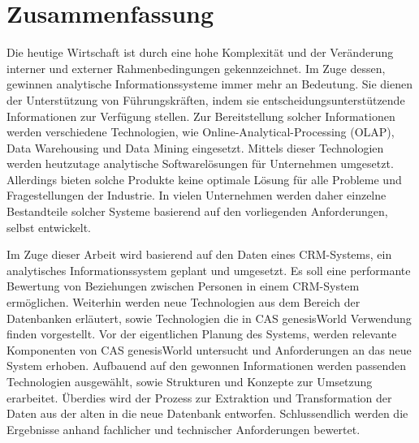 
\chapter*{\centering Zusammenfassung}

Die heutige Wirtschaft ist durch eine hohe Komplexität und der Veränderung interner und externer Rahmenbedingungen gekennzeichnet. Im Zuge dessen, gewinnen analytische Informationssysteme immer mehr an Bedeutung. Sie dienen der Unterstützung von Führungskräften, indem sie entscheidungsunterstützende Informationen zur Verfügung stellen. Zur Bereitstellung solcher Informationen werden verschiedene Technologien, wie Online-Analytical-Processing (OLAP), Data Warehousing und Data Mining eingesetzt. Mittels dieser Technologien werden heutzutage analytische Softwarelösungen für Unternehmen umgesetzt. Allerdings bieten solche Produkte keine optimale Lösung für alle Probleme und Fragestellungen der Industrie. In vielen Unternehmen werden daher einzelne Bestandteile solcher Systeme basierend auf den vorliegenden Anforderungen, selbst entwickelt.

Im Zuge dieser Arbeit wird basierend auf den Daten eines CRM-Systems, ein analytisches Informationssystem geplant und umgesetzt. Es soll eine performante Bewertung von Beziehungen zwischen Personen in einem CRM-System ermöglichen. Weiterhin werden neue Technologien aus dem Bereich der Datenbanken erläutert, sowie Technologien die in CAS genesisWorld Verwendung finden vorgestellt. Vor der eigentlichen Planung des Systems, werden relevante Komponenten von CAS genesisWorld untersucht und Anforderungen an das neue System erhoben. Aufbauend auf den gewonnen Informationen werden passenden Technologien ausgewählt, sowie Strukturen und Konzepte zur Umsetzung erarbeitet. Überdies wird der Prozess zur Extraktion und Transformation der Daten aus der alten in die neue Datenbank entworfen. Schlussendlich werden die Ergebnisse anhand fachlicher und technischer Anforderungen bewertet.